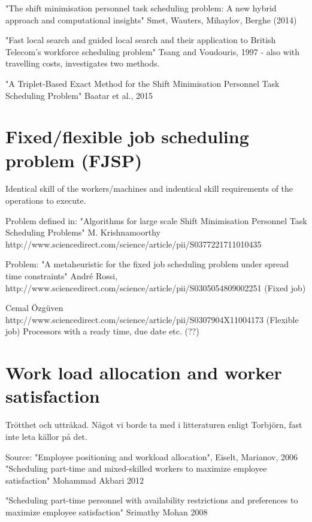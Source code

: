 "The shift minimisation personnel task scheduling problem: A new hybrid approach and computational insights" Smet, Wauters, Mihaylov, Berghe (2014)

"Fast local search and guided local search and their application to British Telecom's workforce scheduling problem" Tsang and Voudouris, 1997 - also with travelling costs, investigates two methods.

"A Triplet-Based Exact Method for the Shift Minimisation Personnel Task Scheduling Problem" Baatar et al., 2015

\section{Fixed/flexible job scheduling problem (FJSP)}
Identical skill of the workers/machines and indentical skill requirements of the operations to execute.

Problem defined in: "Algorithms for large scale Shift Minimisation Personnel Task Scheduling Problems" M. Krishnamoorthy
http://www.sciencedirect.com/science/article/pii/S0377221711010435

Problem: "A metaheuristic for the fixed job scheduling problem under spread time constraints" André Rossi, http://www.sciencedirect.com/science/article/pii/S0305054809002251 (Fixed job)

Cemal Özgüven
http://www.sciencedirect.com/science/article/pii/S0307904X11004173 (Flexible job)
Processors with a ready time, due date etc. (??)

\section{Work load allocation and worker satisfaction}
Trötthet och uttråkad. Något vi borde ta med i litteraturen enligt Torbjörn, fast inte leta källor på det.

Source: "Employee positioning and workload allocation", Eiselt, Marianov, 2006
"Scheduling part-time and mixed-skilled workers to maximize employee satisfaction" Mohammad Akbari 2012

"Scheduling part-time personnel with availability restrictions and preferences to maximize employee satisfaction" Srimathy Mohan 2008



